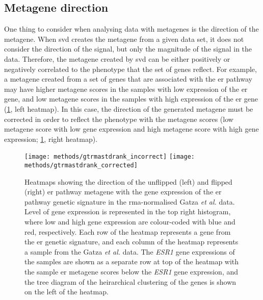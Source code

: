 \subsection{Metagene direction}
\label{sub:metagene_direction}

One thing to consider when analysing data with metagenes is the direction of the metagene.
When \gls{svd} creates the metagene from a given data set, it does not consider the direction of the signal, but only the magnitude of the signal in the data.
Therefore, the metagene created by \gls{svd} can be either positively or negatively correlated to the phenotype that the set of genes reflect.
For example, a metagene created from a set of genes that are associated with the \gls{er} pathway may have higher metagene scores in the samples with low expression of the \gls{er} gene, and low metagene scores in the samples with high expression of the \gls{er} gene (\cref{fig:methods/meta_dir}, left heatmap).
In this case, the direction of the generated metagene must be corrected in order to reflect the phenotype with the metagene scores (low metagene score with low gene expression and high metagene score with high gene expression; \cref{fig:methods/meta_dir}, right heatmap).

\begin{figure}[htpb]
	\centering
	\texttt{[image: methods/gtrmastdrank\_incorrect]}
	\hfill
	\texttt{[image: methods/gtrmastdrank\_corrected]}
	\caption[Example heatmaps showing the direction of the uncorrected and corrected \acrshort{er} pathway metagene with the gene expression of the \acrshort{er} pathway genetic signature in the \acrshort{rma}-normalised Gatza \textit{et al.} data.]{Heatmaps showing the direction of the unflipped (left) and flipped (right) \gls{er} pathway metagene with the gene expression of the \gls{er} pathway genetic signature in the \gls{rma}-normalised Gatza \textit{et al.} data.
	Level of gene expression is represented in the top right histogram, where low and high gene expression are colour-coded with blue and red, respectively.
	Each row of the heatmap represents a gene from the \gls{er} genetic signature, and each column of the heatmap represents a sample from the Gatza \textit{et al.} data.
	The \textit{ESR1} gene expressions of the samples are shown as a separate row at top of the heatmap with the sample \gls{er} metagene scores below the \textit{ESR1} gene expression, and the tree diagram of the heirarchical clustering of the genes is shown on the left of the heatmap.
	}
	\label{fig:methods/meta_dir}
\end{figure}

